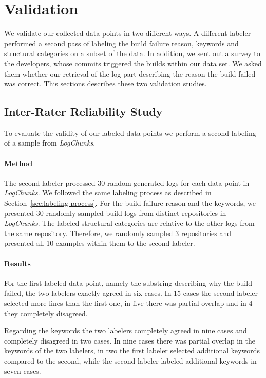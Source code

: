 \documentclass[\myrootdir/main.tex]{subfiles}
\begin{document}
\section{Validation}
We validate our collected data points in two different ways.
A different labeler performed a second pass of labeling the build failure reason, keywords and structural categories on a subset of the data.
In addition, we sent out a survey to the developers, whose commits triggered the builds within our data set.
We asked them whether our retrieval of the log part describing the reason the build failed was correct.
This sections describes these two validation studies.

\subsection{Inter-Rater Reliability Study}
To evaluate the validity of our labeled data points we perform a second labeling of a sample from \emph{LogChunks}.

\paragraph{Method}
The second labeler processed 30 random generated logs for each data point in \emph{LogChunks}.
We followed the same labeling process as described in Section~\ref{sec:labeling-process}.
For the build failure reason and the keywords, we presented 30 randomly sampled build logs from distinct repositories in \emph{LogChunks}.
The labeled structural categories are relative to the other logs from the same repository.
Therefore, we randomly sampled 3 repositories and presented all 10 examples within them to the second labeler.

\paragraph{Results}
For the first labeled data point, namely the substring describing why the build failed, the two labelers exactly agreed in six cases.
In 15 cases the second labeler selected more lines than the first one, in five there was partial overlap and in 4 they completely disagreed.

Regarding the keywords the two labelers completely agreed in nine cases and completely disagreed in two cases.
In nine cases there was partial overlap in the keywords of the two labelers, in two the first labeler selected additional keywords compared to the second, while the second labeler labeled additional keywords in seven cases.
\end{document}
